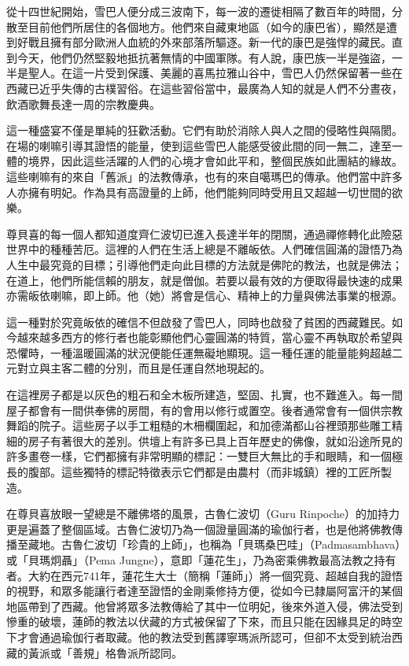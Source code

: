 從十四世紀開始，雪巴人便分成三波南下，每一波的遷徙相隔了數百年的時間，分散至目前他們所居住的各個地方。他們來自藏東地區（如今的康巴省），顯然是遭到好戰且擁有部分歐洲人血統的外來部落所驅逐。新一代的康巴是強悍的藏民。直到今天，他們仍然堅毅地抵抗著無情的中國軍隊。有人說，康巴族一半是強盜，一半是聖人。在這一片受到保護、美麗的喜馬拉雅山谷中，雪巴人仍然保留著一些在西藏已近乎失傳的古樸習俗。在這些習俗當中，最廣為人知的就是人們不分晝夜，飲酒歌舞長達一周的宗教慶典。

這一種盛宴不僅是單純的狂歡活動。它們有助於消除人與人之間的侵略性與隔閡。在場的喇嘛引導其證悟的能量，使到這些雪巴人能感受彼此間的同一無二，達至一體的境界，因此這些活躍的人們的心境才會如此平和，整個民族如此團結的緣故。這些喇嘛有的來自「舊派」的法教傳承，也有的來自噶瑪巴的傳承。他們當中許多人亦擁有明妃。作為具有高證量的上師，他們能夠同時受用且又超越一切世間的欲樂。

尊貝喜的每一個人都知道度齊仁波切已進入長達半年的閉關，通過禪修轉化此險惡世界中的種種苦厄。這裡的人們在生活上總是不離皈依。人們確信圓滿的證悟乃為人生中最究竟的目標；引導他們走向此目標的方法就是佛陀的教法，也就是佛法；在道上，他們所能信賴的朋友，就是僧伽。若要以最有效的方便取得最快速的成果亦需皈依喇嘛，即上師。他（她）將會是信心、精神上的力量與佛法事業的根源。

這一種對於究竟皈依的確信不但啟發了雪巴人，同時也啟發了貧困的西藏難民。如今越來越多西方的修行者也能彰顯他們心靈圓滿的特質，當心靈不再執取於希望與恐懼時，一種溫暖圓滿的狀況便能任運無礙地顯現。這一種任運的能量能夠超越二元對立與主客二體的分別，而且是任運自然地現起的。

在這裡房子都是以灰色的粗石和全木板所建造，堅固、扎實，也不難進入。每一間屋子都會有一間供奉佛的房間，有的會用以修行或置空。後者通常會有一個供宗教舞蹈的院子。這些房子以手工粗糙的木柵欄圍起，和加德滿都山谷裡頭那些雕工精細的房子有著很大的差別。供壇上有許多已具上百年歷史的佛像，就如沿途所見的許多畫卷一樣，它們都擁有非常明顯的標記：一雙巨大無比的手和眼睛，和一個極長的腹部。這些獨特的標記特徵表示它們都是由農村（而非城鎮）裡的工匠所製造。

在尊貝喜放眼一望總是不離佛塔的風景，古魯仁波切（Guru
Rinpoche）的加持力更是遍蓋了整個區域。古魯仁波切乃為一個證量圓滿的瑜伽行者，也是他將佛教傳播至藏地。古魯仁波切「珍貴的上師」，也稱為「貝瑪桑巴哇」（Padmasambhava）或「貝瑪炯聶」（Pema
Jungne），意即「蓮花生」，乃為密乘佛教最高法教之持有者。大約在西元741年，蓮花生大士（簡稱「蓮師」）將一個究竟、超越自我的證悟的視野，和眾多能讓行者達至證悟的金剛乘修持方便，從如今已隸屬阿富汗的某個地區帶到了西藏。他曾將眾多法教傳給了其中一位明妃，後來外道入侵，佛法受到慘重的破壞，蓮師的教法以伏藏的方式被保留了下來，而且只能在因緣具足的時空下才會通過瑜伽行者取藏。他的教法受到舊譯寧瑪派所認可，但卻不太受到統治西藏的黃派或「善規」格魯派所認同。

